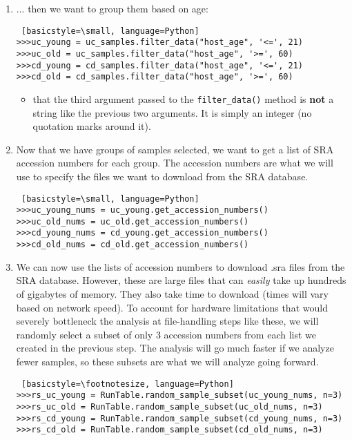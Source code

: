 \begin{enumerate}
                
            \item ... then we want to group them based on age:
            \begin{lstlisting} [basicstyle=\small, language=Python]
>>>uc_young = uc_samples.filter_data("host_age", '<=', 21)
>>>uc_old = uc_samples.filter_data("host_age", '>=', 60)
>>>cd_young = cd_samples.filter_data("host_age", '<=', 21)
>>>cd_old = cd_samples.filter_data("host_age", '>=', 60)
            \end{lstlisting}
                \begin{itemize}
                \item {} that the third argument passed to the \verb|filter_data()| method is \textbf{not} a string like the previous two arguments. It is simply an integer (no quotation marks around it).
                \end{itemize}
                
                
            \item Now that we have groups of samples selected, we want to get a list of SRA accession numbers for each group. The accession numbers are what we will use to specify the files we want to download from the SRA database. 
            \begin{lstlisting} [basicstyle=\small, language=Python]
>>>uc_young_nums = uc_young.get_accession_numbers()
>>>uc_old_nums = uc_old.get_accession_numbers()
>>>cd_young_nums = cd_young.get_accession_numbers()
>>>cd_old_nums = cd_old.get_accession_numbers()
            \end{lstlisting}
            
            
            \item {}
            We can now use the lists of accession numbers to download .sra files from the SRA database. However, these are large files that can \textit{easily} take up hundreds of gigabytes of memory. They also take time to download (times will vary based on network speed). To account for hardware limitations that would severely bottleneck the analysis at file-handling steps like these, we will randomly select a subset of only 3 accession numbers from each list we created in the previous step. The analysis will go much faster if we analyze fewer samples, so these subsets are what we will analyze going forward.
            \begin{lstlisting} [basicstyle=\footnotesize, language=Python]
>>>rs_uc_young = RunTable.random_sample_subset(uc_young_nums, n=3)
>>>rs_uc_old = RunTable.random_sample_subset(uc_old_nums, n=3)
>>>rs_cd_young = RunTable.random_sample_subset(cd_young_nums, n=3)
>>>rs_cd_old = RunTable.random_sample_subset(cd_old_nums, n=3)
            \end{lstlisting}
            

\end{enumerate}
